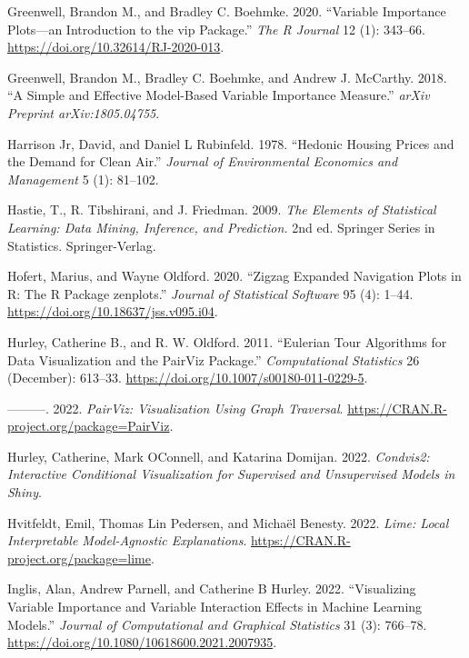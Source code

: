\begin{CSLReferences}{1}{0}
\leavevmode{}%
Greenwell, Brandon M., and Bradley C. Boehmke. 2020. {``Variable Importance Plots---an Introduction to the {vip} Package.''} \emph{The R Journal} 12 (1): 343--66. \url{https://doi.org/10.32614/RJ-2020-013}.

\leavevmode{}%
Greenwell, Brandon M., Bradley C. Boehmke, and Andrew J. McCarthy. 2018. {``A Simple and Effective Model-Based Variable Importance Measure.''} \emph{arXiv Preprint arXiv:1805.04755}.

\leavevmode{}%
Harrison Jr, David, and Daniel L Rubinfeld. 1978. {``Hedonic Housing Prices and the Demand for Clean Air.''} \emph{Journal of Environmental Economics and Management} 5 (1): 81--102.

\leavevmode{}%
Hastie, T., R. Tibshirani, and J. Friedman. 2009. \emph{The Elements of Statistical Learning: Data Mining, Inference, and Prediction.} 2nd ed. Springer Series in Statistics. Springer-Verlag.

\leavevmode{}%
Hofert, Marius, and Wayne Oldford. 2020. {``Zigzag Expanded Navigation Plots in {R}: The {R} Package {zenplots}.''} \emph{Journal of Statistical Software} 95 (4): 1--44. \url{https://doi.org/10.18637/jss.v095.i04}.

\leavevmode{}%
Hurley, Catherine B., and R. W. Oldford. 2011. {``Eulerian Tour Algorithms for Data Visualization and the PairViz Package.''} \emph{Computational Statistics} 26 (December): 613--33. \url{https://doi.org/10.1007/s00180-011-0229-5}.

\leavevmode{}%
---------. 2022. \emph{PairViz: Visualization Using Graph Traversal}. \url{https://CRAN.R-project.org/package=PairViz}.

\leavevmode{}%
Hurley, Catherine, Mark OConnell, and Katarina Domijan. 2022. \emph{Condvis2: Interactive Conditional Visualization for Supervised and Unsupervised Models in Shiny}.

\leavevmode{}%
Hvitfeldt, Emil, Thomas Lin Pedersen, and Michaël Benesty. 2022. \emph{Lime: Local Interpretable Model-Agnostic Explanations}. \url{https://CRAN.R-project.org/package=lime}.

\leavevmode{}%
Inglis, Alan, Andrew Parnell, and Catherine B Hurley. 2022. {``Visualizing Variable Importance and Variable Interaction Effects in Machine Learning Models.''} \emph{Journal of Computational and Graphical Statistics} 31 (3): 766--78. \url{https://doi.org/10.1080/10618600.2021.2007935}.


\end{CSLReferences}
